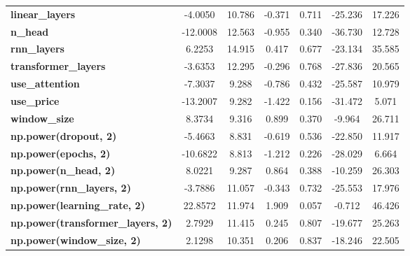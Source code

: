 \begin{center}
\begin{tabular}{lcccccc}
\textbf{linear\_layers}                   &      -4.0050  &       10.786     &    -0.371  &         0.711        &      -25.236    &       17.226     \\
\textbf{n\_head}                          &     -12.0008  &       12.563     &    -0.955  &         0.340        &      -36.730    &       12.728     \\
\textbf{rnn\_layers}                      &       6.2253  &       14.915     &     0.417  &         0.677        &      -23.134    &       35.585     \\
\textbf{transformer\_layers}              &      -3.6353  &       12.295     &    -0.296  &         0.768        &      -27.836    &       20.565     \\
\textbf{use\_attention}                   &      -7.3037  &        9.288     &    -0.786  &         0.432        &      -25.587    &       10.979     \\
\textbf{use\_price}                       &     -13.2007  &        9.282     &    -1.422  &         0.156        &      -31.472    &        5.071     \\
\textbf{window\_size}                     &       8.3734  &        9.316     &     0.899  &         0.370        &       -9.964    &       26.711     \\
\textbf{np.power(dropout, 2)}             &      -5.4663  &        8.831     &    -0.619  &         0.536        &      -22.850    &       11.917     \\
\textbf{np.power(epochs, 2)}              &     -10.6822  &        8.813     &    -1.212  &         0.226        &      -28.029    &        6.664     \\
\textbf{np.power(n\_head, 2)}             &       8.0221  &        9.287     &     0.864  &         0.388        &      -10.259    &       26.303     \\
\textbf{np.power(rnn\_layers, 2)}         &      -3.7886  &       11.057     &    -0.343  &         0.732        &      -25.553    &       17.976     \\
\textbf{np.power(learning\_rate, 2)}      &      22.8572  &       11.974     &     1.909  &         0.057        &       -0.712    &       46.426     \\
\textbf{np.power(transformer\_layers, 2)} &       2.7929  &       11.415     &     0.245  &         0.807        &      -19.677    &       25.263     \\
\textbf{np.power(window\_size, 2)}        &       2.1298  &       10.351     &     0.206  &         0.837        &      -18.246    &       22.505     \\

\end{tabular}
\end{center}
